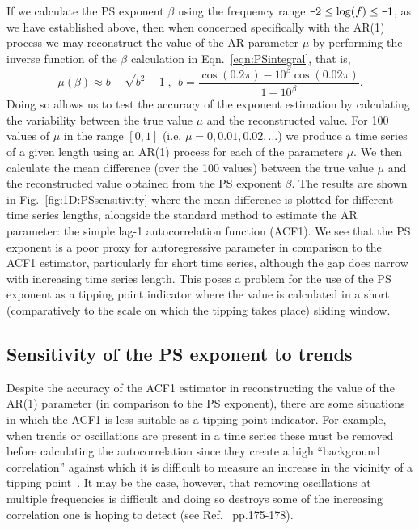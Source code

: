 \documentclass[10pt]{iopart}
\newcommand{\m}{\textup{\texttt{-}}}
\newcommand{\revision}[1]{\color{red} {#1}}
\begin{document}
If we calculate the PS exponent $\beta$ using the frequency range $\m2\leq\log(f)\leq\m1$, as we have established above, then when concerned specifically with the AR(1) process we may reconstruct the value of the AR parameter $\mu$ by performing the inverse function of the $\beta$ calculation in Eqn.~\ref{eqn:PSintegral}, that is,
\begin{equation}
	\label{eqn:1D:PSindicator:reconstruct_mu_repro}
	\mu(\beta)\approx b-\sqrt{b^2-1}~, ~~ b = \frac{\cos(0.2\pi)-10^\beta \cos(0.02\pi)}{1-10^\beta}.
\end{equation}
Doing so allows us to test the accuracy of the exponent estimation by calculating the variability between the true value $\mu$ and the reconstructed value. For 100 values of $\mu$ in the range $[0,1]$ (i.e. $\mu = 0, 0.01, 0.02, ...$) we produce a time series of a given length using an AR(1) process for each of the parameters $\mu$. We then calculate the mean difference (over the 100 values) between the true value $\mu$ and the reconstructed value obtained from the PS exponent $\beta$. The results are shown in Fig.~\ref{fig:1D:PSsensitivity} where the mean difference is plotted for different time series lengths, alongside the standard method to estimate the AR parameter: the simple lag-1 autocorrelation function (ACF1). We see that the PS exponent is a poor proxy for autoregressive parameter in comparison to the ACF1 estimator, {\revision particularly} for short time series, although the gap does narrow with increasing time series length. This poses a problem for the use of the PS exponent as a tipping point indicator where the value is calculated in a short (comparatively to the scale on which the tipping takes place) sliding window. 


\subsection{Sensitivity of the PS exponent to trends}

Despite the accuracy of the ACF1 estimator in reconstructing the value of the AR(1) parameter (in comparison to the PS exponent), there are some situations in which the ACF1 is less suitable as a tipping point indicator. For example, when trends or oscillations are present in a time series these must be removed before calculating the autocorrelation since they create a high ``background correlation'' against which it is difficult to measure an increase in the vicinity of a tipping point~\cite{prettyman2019}. It may be the case, however, that removing oscillations at multiple frequencies is difficult and doing so destroys some of the increasing correlation one is hoping to detect (see Ref.~\cite{prettyman2021} pp.175-178). 
\end{document}
